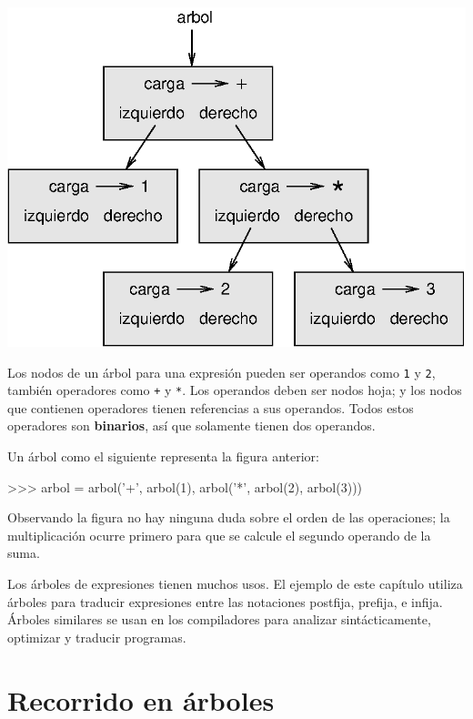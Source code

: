 \beforefig \centerline{\includegraphics{illustrations/tree2}}
\afterfig

Los nodos de un árbol para una expresión pueden ser operandos como
\texttt{1} y \texttt{2}, también operadores como \texttt{+} y \texttt{{*}}.
Los operandos deben ser nodos hoja; y los nodos que contienen operadores
tienen referencias a sus operandos. Todos estos operadores son \textbf{binarios},
así que solamente tienen dos operandos.

Un árbol como el siguiente representa la figura anterior:

\beforeverb 
\begin{pyconcode}
>>> arbol = arbol('+', arbol(1), 
                       arbol('*', arbol(2), arbol(3)))
\end{pyconcode}
\afterverb Observando la figura no hay ninguna duda sobre el orden
de las operaciones; la multiplicación ocurre primero para que se calcule
el segundo operando de la suma.

Los árboles de expresiones tienen muchos usos. El ejemplo de este
capítulo utiliza árboles para traducir expresiones entre las notaciones
postfija, prefija, e infija. Árboles similares se usan en los compiladores
para analizar sintácticamente, optimizar y traducir programas.

\section{Recorrido en árboles}

   
 

